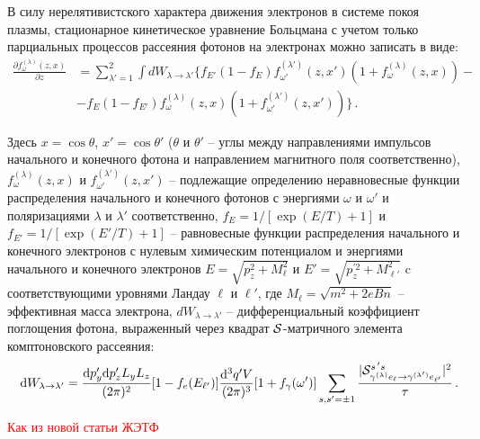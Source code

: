 \documentclass[14pt, russian]{article}
\newcommand{\dd}{\mathrm{d}} %
\begin{document}
В силу нерелятивистского характера движения электронов в системе покоя плазмы, стационарное кинетическое уравнение Больцмана с учетом только парциальных процессов рассеяния фотонов на электронах можно записать в виде:
\begin{equation} 
\begin{aligned}\label{Kineq:Gen}
\frac{\partial f_\omega^{(\lambda)}(z, x)}{\partial z}&=\sum_{\lambda'=1}^{2} \int dW_{\lambda\to\lambda'}\{f_{E'}(1-f_E)f^{(\lambda')}_{\omega'}(z, x') (1+f_\omega^{(\lambda)}(z, x))-
\\
&-f_E (1-f_{E'}) f_\omega^{(\lambda)}(z,x)(1+f^{(\lambda')}_{\omega'}(z, x'))
	\}\, .
\end{aligned}
\end{equation}

Здесь $x = \cos \theta$, $x' = \cos \theta'$ ($\theta$ и $\theta'$ -- углы между направлениями импульсов начального и конечного фотона и направлением магнитного поля соответственно),   $f^{(\lambda)}_\omega(z, x)$ и $f^{(\lambda')}_{\omega'}(z, x')$ -- подлежащие определению неравновесные функции распределения начального и конечного фотонов с энергиями $\omega$ и $ \omega'$ и поляризациями $\lambda$ и $\lambda'$ соответственно,  $f_E = 1/[\exp(E/T)+1]$ и $f_{E'} = 1/[\exp(E'/T)+1]$ --  равновесные функции распределения начального и конечного электронов с нулевым химическим потенциалом и энергиями начального и конечного электронов $E=\sqrt{p_z^2+M_\ell^2}$ и $E'=\sqrt{p_z^{\prime2}+M_{\ell'}^{ 2}}$ c соответствующими уровнями Ландау $\ell$ и $\ell'$, где $M_\ell = \sqrt{m^2 + 2eBn}$ -- эффективная масса электрона, $dW_{\lambda \to \lambda'}$ -- дифференциальный коэффициент поглощения фотона, выраженный через квадрат ${\cal S}$-матричного элемента комптоновского рассеяния:
\begin{eqnarray}
	\label{dW}
	&&\dd W_{\lambda \to \lambda'} =  
	\frac{\dd p'_y \dd p'_z L_y L_z }{(2\pi)^2} [1 - f_e (E_{\ell'})]
	\frac{\dd^3 q' V}{(2\pi)^3}  [1 + f_{\gamma} ({\omega'})] 
	\sum\limits_{s, s'=\pm 1} 
	\frac{|{\cal S}^{s^{\,\prime} s}_{{\gamma^{(\lambda)} e_\ell \to 
	\gamma^{(\lambda')} e_{\ell'}}}|^2}{\tau} 
	\, .
\end{eqnarray}


\textcolor{red}{Как из новой статьи ЖЭТФ}
\end{document}
